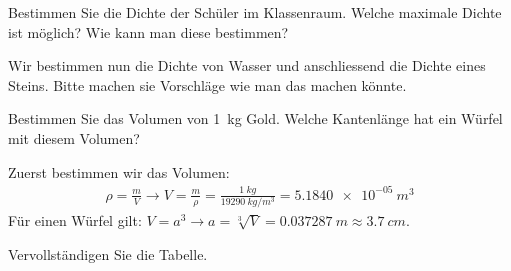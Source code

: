 \documentclass[12pt,a4paper,twoside]{article}
\begin{document}
\begin{aufgabe}
Bestimmen Sie die Dichte der Schüler im Klassenraum.
Welche maximale Dichte ist möglich? Wie kann man diese bestimmen?
\end{aufgabe}


Wir bestimmen nun die Dichte von Wasser und anschliessend die Dichte eines Steins. 
Bitte machen sie Vorschläge wie man das machen könnte.\par


\begin{aufgabe}
	Bestimmen Sie das Volumen von \SI{1}{kg} Gold. Welche Kantenlänge hat ein Würfel mit diesem Volumen?
	\begin{loesung}
		Zuerst bestimmen wir das Volumen:
		\begin{eqnarray*}
			\rho=\frac{m}{V}\to V=\frac{m}{\rho}=\frac{\SI{1}{kg}}{\SI{19290}{kg/m^3}}=\SI{5.1840e-05}{m^3}
		\end{eqnarray*}
		Für einen Würfel gilt: $V=a^3\to a=\sqrt[3]{V}=\SI{0.037287}{m}\approx\SI{3.7}{cm}$.
	\end{loesung}
\end{aufgabe}

\begin{aufgabe}
	Vervollständigen Sie die Tabelle.


\begin{loesung}


	
\end{loesung}

\end{aufgabe}
\end{document}
